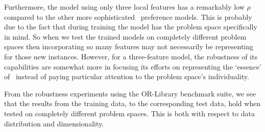 Furthermore, the model using only three local features has a remarkably low 
$\rho$ compared to the other more sophisticated \phiLocalRelated\ preference 
models. This is probably due to the fact that during training the model has  
the  problem space specifically in mind. So when we test the 
trained models on completely different problem spaces then incorporating so 
many features may not necessarily be representing for those new instances. 
However, for a three-feature model, the robustness of its capabilities are somewhat 
more in focusing its efforts on representing the `essence' of \jsp\ 
instead of paying particular attention to the problem space's individuality. 

From the robustness experiments using the OR-Library benchmark suite, we see 
that the results from the training data, to the corresponding test data, hold 
when tested on completely different problem spaces. This is both with respect 
to data distribution and dimensionality.